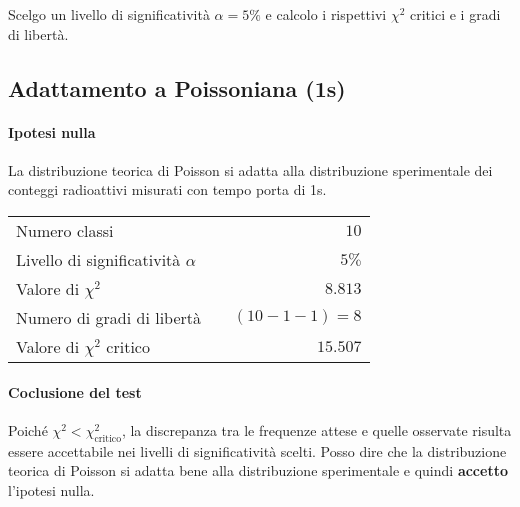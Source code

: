 \documentclass{article}
\begin{document}
\noindent
Scelgo un livello di significatività $\alpha = 5\%$ e calcolo i rispettivi $\chi^2$ critici e i gradi di libertà.




\subsection{Adattamento a Poissoniana (1s)}
\paragraph{Ipotesi nulla} La distribuzione teorica di Poisson si adatta alla distribuzione sperimentale dei conteggi radioattivi misurati con tempo porta di 1s. 

\vspace{0.2cm}
\begin{center}
\begin{tabular}{lr}
	Numero classi & $10$ \\
	Livello di significatività $\alpha$		& $ \quad 5\%$  \\
	Valore di $\chi ^2$             	& $\quad 8.813$       \\
	Numero di gradi di libertà      	& $\quad (10-1-1) = 8$         \\   
	Valore di $\chi ^2$ critico     	& $\quad 15.507$
\end{tabular}
\end{center}

\paragraph{Coclusione del test} Poiché $\chi^2 < \chi^2_{\text{critico}}$, la discrepanza tra le frequenze attese e quelle osservate risulta essere accettabile nei livelli di significatività scelti. Posso dire che la distribuzione teorica di Poisson si adatta bene alla distribuzione sperimentale e quindi \textbf{accetto} l'ipotesi nulla.

\begin{center}
\end{center}
\end{document}
